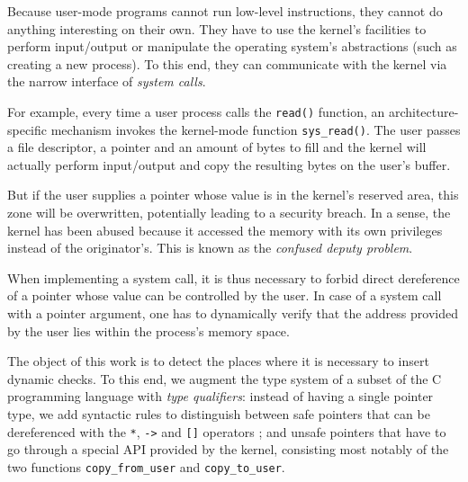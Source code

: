 Because user-mode programs cannot run low-level instructions, they cannot do
anything interesting on their own. They have to use the kernel's facilities to
perform input/output or manipulate the operating system's abstractions (such as
creating a new process). To this end, they can communicate with the kernel
via the narrow interface of \emph{system calls}.

For example, every time a user process calls the \texttt{read()} function, an
architecture-specific mechanism invokes the kernel-mode function
\texttt{sys\_read()}. The user passes a file descriptor, a pointer and an amount
of bytes to fill and the kernel will actually perform input/output and copy the
resulting bytes on the user's buffer.

But if the user supplies a pointer whose value is in the kernel's reserved area,
this zone will be overwritten, potentially leading to a security breach. In a
sense, the kernel has been abused because it accessed the memory with its own
privileges instead of the originator's. This is known as the \emph{confused
deputy problem}\cite{hardy88confused}.

When implementing a system call, it is thus necessary to forbid direct
dereference of a pointer whose value can be controlled by the user. In case of a
system call with a pointer argument, one has to dynamically verify that the
address provided by the user lies within the process's memory space.

The object of this work is to detect the places where it is necessary to insert
dynamic checks. To this end, we augment the type system of a subset of the C
programming language with \emph{type qualifiers}: instead of having a single
pointer type, we add syntactic rules to distinguish between safe pointers that
can be dereferenced with the \texttt{*}, \texttt{->} and \texttt{[]} operators ;
and unsafe pointers that have to go through a special API provided by the
kernel, consisting most notably of the two functions \texttt{copy\_from\_user}
and \texttt{copy\_to\_user}.
